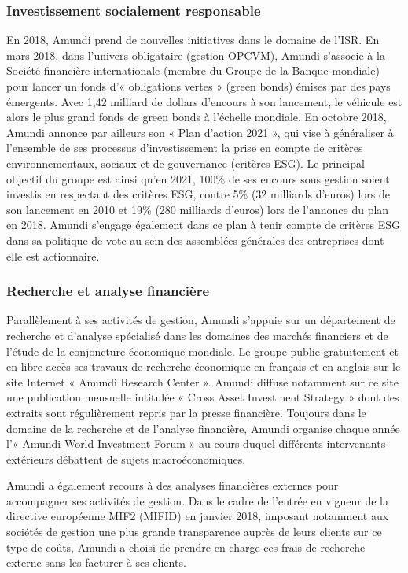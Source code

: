 \subsubsection{Investissement socialement responsable}
\par En 2018, Amundi prend de nouvelles initiatives dans le domaine de l'ISR. En mars 2018, dans l'univers obligataire (gestion OPCVM), Amundi s’associe à la Société financière internationale (membre du Groupe de la Banque mondiale) pour lancer un fonds d'« obligations vertes » (green bonds) émises par des pays émergents. Avec 1,42 milliard de dollars d'encours à son lancement, le véhicule est alors le plus grand fonds de green bonds à l'échelle mondiale. En octobre 2018, Amundi annonce par ailleurs son « Plan d'action 2021 », qui vise à généraliser à l'ensemble de ses processus d'investissement la prise en compte de critères environnementaux, sociaux et de gouvernance (critères ESG). Le principal objectif du groupe est ainsi qu'en 2021, 100\% de ses encours sous gestion soient investis en respectant des critères ESG, contre 5\% (32 milliards d'euros) lors de son lancement en 2010 et 19\% (280 milliards d'euros) lors de l'annonce du plan en 2018. Amundi s'engage également dans ce plan à tenir compte de critères ESG dans sa politique de vote au sein des assemblées générales des entreprises dont elle est actionnaire.
\subsubsection{Recherche et analyse financière}
\par Parallèlement à ses activités de gestion, Amundi s'appuie sur un département de recherche et d'analyse spécialisé dans les domaines des marchés financiers et de l'étude de la conjoncture économique mondiale. Le groupe publie gratuitement et en libre accès ses travaux de recherche économique en français et en anglais sur le site Internet « Amundi Research Center ». Amundi diffuse notamment sur ce site une publication mensuelle intitulée « Cross Asset Investment Strategy » dont des extraits sont régulièrement repris par la presse financière. Toujours dans le domaine de la recherche et de l'analyse financière, Amundi organise chaque année l'« Amundi World Investment Forum » au cours duquel différents intervenants extérieurs débattent de sujets macroéconomiques.
\par Amundi a également recours à des analyses financières externes pour accompagner ses activités de gestion. Dans le cadre de l'entrée en vigueur de la directive européenne MIF2 (MIFID) en janvier 2018, imposant notamment aux sociétés de gestion une plus grande transparence auprès de leurs clients sur ce type de coûts, Amundi a choisi de prendre en charge ces frais de recherche externe sans les facturer à ses clients.
